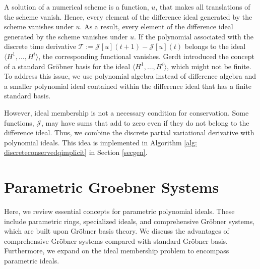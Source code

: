 \documentclass[runningheads]{llncs}
\newcommand{\1}{\chi}
\begin{document}
A solution of a numerical scheme is a function, $u$, that makes all translations of the scheme vanish. Hence, every element of the difference ideal generated by the scheme vanishes under $u$. As a result, every element of the difference ideal generated by the scheme vanishes under $u$. If the polynomial associated with the discrete time derivative  $\mathcal{T}:=\mathcal{J}[u](t+1)-\mathcal{J}[u](t)$
belongs to the ideal $\langle H^1,\ldots,H^i\rangle$, the corresponding functional vanishes. 
 Gerdt introduced the concept of a standard  Gr{\"o}bner basis for the ideal $\langle H^1,\ldots,H^i\rangle$, which might not be finite. To address this issue, we use polynomial algebra instead of difference algebra and a smaller polynomial ideal contained within the difference ideal that has a finite standard basis.
 
 However, ideal membership is not  a necessary condition for conservation. Some functions, $\mathcal{J}$,
 may have sums that add to zero even if they do not belong to the difference ideal. Thus, we combine the discrete partial variational derivative with polynomial ideals. This idea is implemented in Algorithm \ref{alg: discreteconservedqimplicit} in Section \ref{secgen}.












\section{Parametric Groebner Systems}
\label{pgs}

Here, we review essential concepts for 
parametric polynomial ideals. These include parametric rings, 
specialized ideals, and comprehensive Gr{\"o}bner systems, which are built upon 
Gr{\"o}bner basis theory. 
We discuss the advantages of comprehensive Gr{\"o}bner systems 
compared with standard Gr\"obner basis. 
Furthermore, we expand on the ideal membership problem to encompass parametric ideals.
\end{document}
